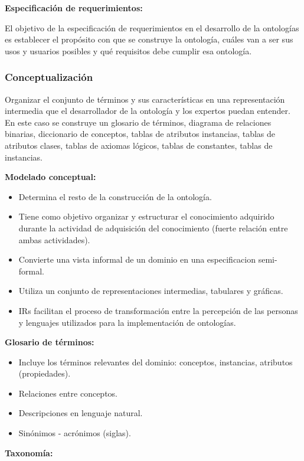 \documentclass[a4paper,10pt,spanish,oneside]{article}
\begin{document}
\textbf{Especificación de requerimientos:}

El objetivo de la especificación de requerimientos en el desarrollo de la ontologías es establecer el propósito con que se construye la ontología, cuáles van a ser sus usos y usuarios posibles y qué requisitos debe cumplir esa ontología.

\subsubsection{Conceptualización}

Organizar el conjunto de términos y sus características en una representación intermedia que el desarrollador de la ontología y los expertos puedan entender. En este caso se construye un glosario de términos, diagrama de relaciones binarias, diccionario de conceptos, tablas de atributos instancias, tablas de atributos clases, tablas de axiomas lógicos, tablas de constantes, tablas de instancias.

\textbf{Modelado conceptual:}

\begin{itemize}
\item Determina el resto de la construcción de la ontología.
\item Tiene como objetivo organizar y estructurar el conocimiento adquirido durante la actividad de adquisición del conocimiento (fuerte relación entre ambas actividades).
\item Convierte una vista informal de un dominio en una especificacion semi-formal.
\item Utiliza un conjunto de representaciones intermedias, tabulares y gráficas.
\item IRs facilitan el proceso de transformación entre la percepción de las personas y lenguajes utilizados para la implementación de ontologías.
\end{itemize}

\textbf{Glosario de términos:}

\begin{itemize}
\item Incluye los términos relevantes del dominio: conceptos, instancias, atributos (propiedades).
\item Relaciones entre conceptos.
\item Descripciones en lenguaje natural.
\item Sinónimos - acrónimos (siglas).
\end{itemize}

\textbf{Taxonomía:}
\end{document}
